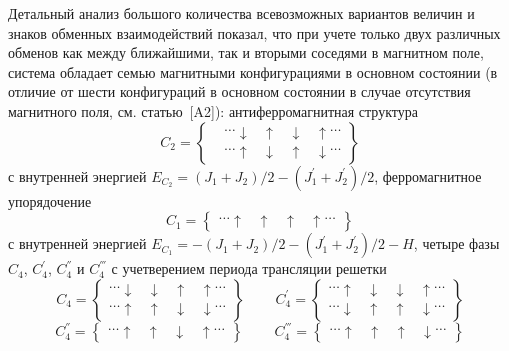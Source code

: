 Детальный анализ большого количества всевозможных вариантов величин и знаков обменных взаимодействий показал, что при учете только двух различных обменов как между ближайшими, так и вторыми соседями в магнитном поле, система обладает семью магнитными конфигурациями в основном состоянии (в отличие от шести конфигураций в основном состоянии в случае отсутствия магнитного поля, см. статью~[A2]): антиферромагнитная структура 
\begin{equation*}
C_2 =
\left\{\!\begin{aligned}
&\dots \downarrow\;\;\; \uparrow \;\;\;\downarrow \;\;\; \uparrow   \dots\\[1ex]
& \dots \uparrow\;\;\; \downarrow \;\;\;\uparrow \;\;\; \downarrow  \dots
\end{aligned}\right\}
\end{equation*}
с внутренней энергией $E_{C_2} = (J_1+J_2)/2-(J_{1}^{'}+J_{2}^{'})/2$, ферромагнитное упорядочение 
\begin{equation*}
C_1 =
\left\{\!\begin{aligned}
\dots \uparrow\;\;\; \uparrow \;\;\;\uparrow \;\;\; \uparrow  \dots
\end{aligned}\right\}
\end{equation*}
с внутренней энергией	$E_{C_1} = -(J_1+J_2)/2-(J_{1}^{'}+J_{2}^{'})/2-H$, четыре фазы $C_{4}$, $C_{4}^{'}$, $C_{4}^{''}$ и $C_{4}^{'''}$ с учетверением периода трансляции решетки 
\begin{equation*}
C_4 =
\left\{\!\begin{aligned}
\dots \downarrow\;\;\; \downarrow \;\;\;\uparrow \;\;\; \uparrow  \dots \\[1ex]
\dots \uparrow\;\;\; \uparrow \;\;\;\downarrow \;\;\; \downarrow  \dots  
\end{aligned}\right\}
\;\;\;\;\;\;\;\;
C_4^{'} =
\left\{\!\begin{aligned}
\dots \uparrow\;\;\; \downarrow \;\;\;\downarrow \;\;\; \uparrow \dots \\[1ex] 
\dots \downarrow\;\;\; \uparrow \;\;\;\uparrow \;\;\; \downarrow \dots 
\end{aligned}\right\}
\end{equation*}
\begin{equation*}
C_4^{''} =
\left\{\!\begin{aligned}
\dots  \uparrow\;\;\; \uparrow \;\;\;\downarrow \;\;\; \uparrow  \dots  
\end{aligned}\right\}
\;\;\;\;\;\;\;\;
C_4^{'''} =
\left\{\!\begin{aligned}
\dots \uparrow\;\;\; \uparrow \;\;\;\uparrow \;\;\; \downarrow \dots 
\end{aligned}\right\}
\end{equation*}
